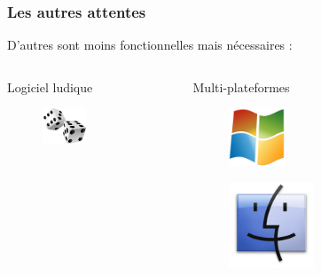 \begin{frame}


  \frametitle{Les autres attentes}
  \large D'autres sont moins fonctionnelles mais nécessaires :
  \bigskip
  \begin{columns}[t]
    \begin{column}{0.5\textwidth}

      \centering \normalsize Logiciel ludique
      \begin{figure}[!h]
        \bigskip
        \begin{center}
          \includegraphics[width = 0.45\textwidth]{presentation/des.png}
        \end{center}
      \end{figure}
    \end{column}
    \begin{column}{0.5\textwidth}
      \centering \normalsize Multi-plateformes
      \begin{figure}[!h]
        \begin{center}
          \includegraphics[width = 0.30\textwidth]{presentation/windows.png}
        \end{center}
      \end{figure}
      
      \begin{figure}[!h]
        \begin{center}
          \includegraphics[width = 0.45\textwidth]{presentation/macos.png}
        \end{center}
      \end{figure}
    \end{column}
    
  \end{columns}
\end{frame}

